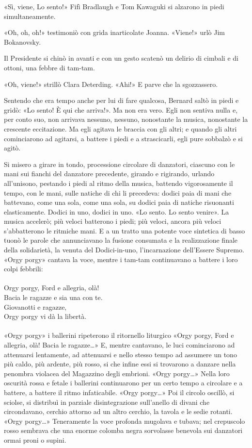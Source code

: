 \documentclass[
a5paper, %
10pt, %
twoside, 
onecolumn, %
openany, %
]{memoir}
\begin{document}
«Sì, viene, Lo sento!» Fifì Bradlaugh e Tom Kawaguki si alzarono in piedi simultaneamente.

«Oh, oh, oh!» testimoniò con grida inarticolate Joanna. «Viene!» urlò Jim Bokanovsky.

Il Presidente si chinò in avanti e con un gesto scatenò un delirio di cimbali e di ottoni, una febbre di tam-tam.

«Oh, viene!» strillò Clara Deterding. «Ahi!» E parve che la sgozzassero.

Sentendo che era tempo anche per lui di fare qualcosa, Bernard saltò in piedi e gridò: «Lo sento! È qui che arriva!». Ma non era vero. Egli non sentiva nulla e, per conto suo, non arrivava nessuno, nessuno, nonostante la musica, nonostante la crescente eccitazione. Ma egli agitava le braccia con gli altri; e quando gli altri cominciarono ad agitarsi, a battere i piedi e a strascicarli, egli pure sobbalzò e si agitò.

Si misero a girare in tondo, processione circolare di danzatori, ciascuno con le mani sui fianchi del danzatore precedente, girando e rigirando, urlando all’unisono, pestando i piedi al ritmo della musica, battendo vigorosamente il tempo, con le mani, sulle natiche di chi li precedeva: dodici paia di mani che battevano, come una sola, come una sola, su dodici paia di natiche risuonanti elasticamente. Dodici in uno, dodici in uno. «Lo sento. Lo sento venire». La musica accelerò; più veloci batterono i piedi; più veloci, ancora più veloci s’abbatterono le ritmiche mani. E a un tratto una potente voce sintetica di basso tuonò le parole che annunciavano la fusione consumata e la realizzazione finale della solidarietà, la venuta del Dodici-in-uno, l’incarnazione dell’Essere Supremo. «Orgy porgy» cantava la voce, mentre i tam-tam continuavano a battere i loro colpi febbrili:
\leavevmode\\\leavevmode\\
{\tiny Orgy porgy, Ford e allegria, olà!\\
Bacia le ragazze e sia una con te.\\
Giovanotti e ragazze,\\
Orgy porgy vi dà la libertà.}
\leavevmode\\\leavevmode\\
«Orgy porgy» i ballerini ripeterono il ritornello liturgico «Orgy porgy, Ford e allegria, olà! Bacia le ragazze…» E, mentre cantavano, le luci cominciarono ad attenuarsi lentamente, ad attenuarsi e nello stesso tempo ad assumere un tono più caldo, più ardente, più rosso, si che infine essi si trovarono a danzare nella penombra violacea del Magazzino degli embrioni. «Orgy porgy…» Nella loro oscurità rossa e fetale i ballerini continuarono per un certo tempo a circolare e a battere, a battere il ritmo infaticabile. «Orgy porgy…» Poi il circolo oscillò, si sciolse, si distribuì in parziale disintegrazione sull’anello di divani che circondavano, cerchio attorno ad un altro cerchio, la tavola e le sedie rotanti. «Orgy porgy…» Teneramente la voce profonda mugolava e tubava; nel crepuscolo rosso sembrava che una enorme colomba negra sorvolasse benevola sui danzatori ormai proni o supini.
\end{document}
